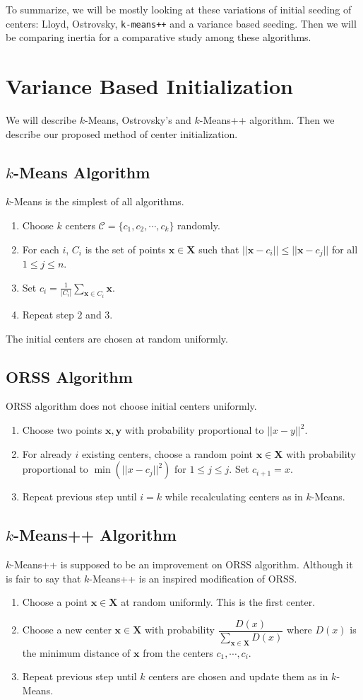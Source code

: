 \documentclass[10pt, leqno]{article}
\begin{document}
	To summarize, we will be mostly looking at these variations of initial seeding of centers: Lloyd, Ostrovsky, \texttt{k-means++} and a variance based seeding. Then we will be comparing inertia for a comparative study among these algorithms.
	\section{Variance Based Initialization}
	We will describe $k$-Means, Ostrovsky's and $k$-Means++ algorithm. Then we describe our proposed method of center initialization.
	\subsection{$k$-Means Algorithm}
	$k$-Means is the simplest of all algorithms.
		\begin{enumerate}[i]
			\item Choose $k$ centers $\mathcal{C}=\{c_1,c_2,\cdots,c_k\}$ randomly.
			\item For each $i$, $C_i$ is the set of points $\mathbf{x}\in\mathbf{X}$ such that $||\mathbf{x}-c_i||\leq ||\mathbf{x}-c_j||$ for all $1\leq j\leq n$.
			\item Set $c_i=\frac{1}{|C_i|}\sum_{\mathbf{x}\in C_i}\mathbf{x}$.
			\item Repeat step $2$ and $3$.
		\end{enumerate}
	The initial centers are chosen at random uniformly.
	\subsection{ORSS Algorithm}
	ORSS algorithm does not choose initial centers uniformly.
		\begin{enumerate}[i]
			\item Choose two points $\mathbf{x},\mathbf{y}$ with probability proportional to $||x-y||^2$.
			\item For already $i$ existing centers, choose a random point $\mathbf{x}\in\mathbf{X}$ with probability proportional to $\min(||x-c_j||^2)$ for $1\leq j\leq j$. Set $c_{i+1}=x$.
			\item Repeat previous step until $i=k$ while recalculating centers as in $k$-Means.
		\end{enumerate}
	\subsection{$k$-Means++ Algorithm}
	$k$-Means++ is supposed to be an improvement on ORSS algorithm. Although it is fair to say that $k$-Means++ is an inspired modification of ORSS.
		\begin{enumerate}[i]
			\item Choose a point $\mathbf{x}\in\mathbf{X}$ at random uniformly. This is the first center.
			\item Choose a new center $\mathbf{x}\in\mathbf{X}$ with probability $\dfrac{D(x)}{\sum_{\mathbf{x}\in\mathbf{X}}D(x)}$ where $D(x)$ is the minimum distance of $\mathbf{x}$ from the centers $c_{1},\cdots,c_i$.
			\item Repeat previous step until $k$ centers are chosen and update them as in $k$-Means.
		\end{enumerate}
\end{document}

